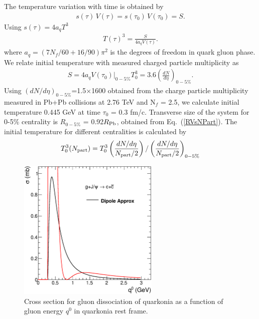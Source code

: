 \documentclass[aps,prc,preprint,superscriptaddress,showpacs,showkeys]{revtex4-1}
\begin{document}
The temperature variation with time is obtained by  
\begin{eqnarray}
s(\tau)\,V(\tau)= s(\tau_0)\,V(\tau_0)=S. 
\end{eqnarray}
Using $s(\tau)=4a_qT^3$ 
\begin{eqnarray}
T(\tau)^{3} = \frac{S}{4a_qV(\tau)}.
\end{eqnarray}
where $a_{q} = (7N_f/60 + 16/90)\pi^2$ is the degrees of freedom in quark gluon phase.
We relate initial temperature with measured charged particle multiplicity as
\begin{eqnarray}
S = 4a_qV(\tau_0)|_{0-5\%} T_{0}^{3} =3.6\left(\frac{dN}{d\eta}\right)_{0-5\%}. 
\label{TempVsMult}
\end{eqnarray}  
Using $(dN/d\eta)_{0-5\%}$=1.5$\times$1600 obtained from the charge particle multiplicity measured in 
Pb+Pb collisions at 2.76 TeV \cite{MULT} and N$_f$ = 2.5, we calculate initial temperature
0.445 GeV at time $\tau_0$ = 0.3 fm/c.
Transverse size of the system for 0-5$\%$ centrality is $R_{0-5\%}$ = 0.92$R_{\rm Pb}$,
 obtained from Eq.~(\ref{RVsNPart}). 
The initial temperature for different centralities is calculated by 
\begin{equation}
T_{0}^{3}({N_{\rm part}})=T_{0}^{3}\left(\frac{dN/d\eta}{N_{\rm part}/2}\right)/\left(\frac{dN/d\eta}{N_{\rm part}/2}\right)_{0-5\%}
\label{TempNpart}
\end{equation}
\begin{figure}
\includegraphics[width=0.60\textwidth]{Fig2_SigmaDq0.eps}
\caption{Cross section for gluon dissociation of quarkonia as a function of gluon energy $q^{0}$ in
quarkonia rest frame.}
\label{fig:SigmaDQ0}
\end{figure}
\end{document}
